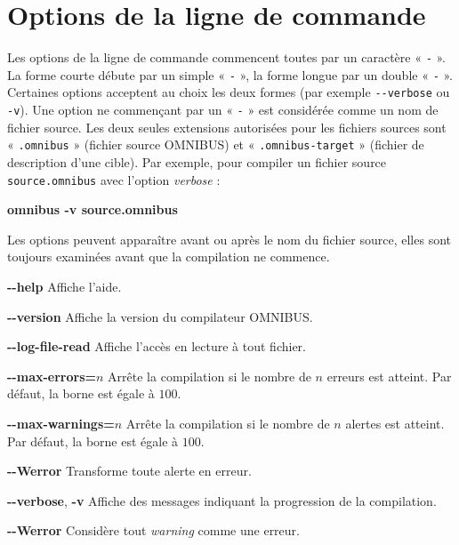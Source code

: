 

\newcommand\OPTION[1]{\colorbox{gray!15}{\ttfamily\bfseries #1}}


\chapter{Options de la ligne de commande}

Les options de la ligne de commande commencent toutes par un caractère « \texttt{-} ». La forme courte débute par un simple « \texttt{-} », la forme longue par un double « \texttt{-} ». Certaines options acceptent au choix les deux formes (par exemple \texttt{-{}-verbose} ou \texttt{-v}). Une option ne commençant par un « \texttt{-} » est considérée comme un nom de fichier source. Les deux seules extensions autorisées pour les fichiers sources sont « \texttt{.omnibus} » (fichier source OMNIBUS) et  « \texttt{.omnibus-target} » (fichier de description d'une cible). Par exemple, pour compiler un fichier source \texttt{source.omnibus} avec l'option \emph{verbose} :

\begin{SHELL}
\bfseries omnibus -v source.omnibus
\end{SHELL}

Les options peuvent apparaître avant ou après le nom du fichier source, elles sont toujours examinées avant que la compilation ne commence.



\OPTION{-{}-help} Affiche l'aide.


\OPTION{-{}-version} Affiche la version du compilateur OMNIBUS.



\OPTION{-{}-log-file-read} Affiche l'accès en lecture à tout fichier.

\OPTION{-{}-max-errors=$n$} Arrête la compilation si le nombre de $n$ erreurs est atteint. Par défaut, la borne est égale à $100$.

\OPTION{-{}-max-warnings=$n$} Arrête la compilation si le nombre de $n$ alertes est atteint. Par défaut, la borne est égale à $100$.

\OPTION{-{}-Werror} Transforme toute alerte en erreur.

\OPTION{-{}-verbose}, \OPTION{-v} Affiche des messages indiquant la progression de la compilation.

\OPTION{-{}-Werror} Considère tout \emph{warning} comme une erreur.

